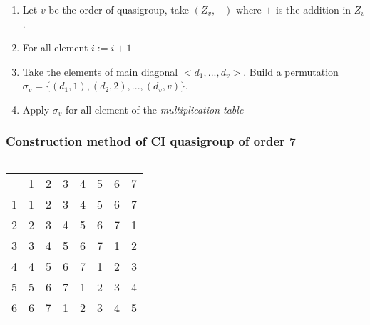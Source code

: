 \begin{frame}
\begin{enumerate}
	\item Let $v$ be the order of quasigroup, take $(Z_v,+)$ where $+$ is the addition in $Z_v$.
	\item For all element $i := i +1$
	\item Take the elements of main diagonal $<d_1,...,d_v>$. Build a permutation $\sigma_v = \{(d_1,1), (d_2,2),..., (d_v,v)\}$.
	\item Apply $\sigma_v$ for all element of the \textit{multiplication table}
\end{enumerate}
\end{frame}


\begin{frame}
\frametitle{Construction method of CI quasigroup of order 7}
\begin{columns}
	\begin{table}[]
		\begin{tabular}{llllllll}
			& 1                      & 2                      & 3                      & 4                      & 5                      & 6                      & 7                      \\ \cline{2-8} 
			\multicolumn{1}{l|}{1} & \multicolumn{1}{l|}{1} & \multicolumn{1}{l|}{2} & \multicolumn{1}{l|}{3} & \multicolumn{1}{l|}{4} & \multicolumn{1}{l|}{5} & \multicolumn{1}{l|}{6} & \multicolumn{1}{l|}{7} \\ \cline{2-8} 
			\multicolumn{1}{l|}{2} & \multicolumn{1}{l|}{2} & \multicolumn{1}{l|}{3} & \multicolumn{1}{l|}{4} & \multicolumn{1}{l|}{5} & \multicolumn{1}{l|}{6} & \multicolumn{1}{l|}{7} & \multicolumn{1}{l|}{1} \\ \cline{2-8} 
			\multicolumn{1}{l|}{3} & \multicolumn{1}{l|}{3} & \multicolumn{1}{l|}{4} & \multicolumn{1}{l|}{5} & \multicolumn{1}{l|}{6} & \multicolumn{1}{l|}{7} & \multicolumn{1}{l|}{1} & \multicolumn{1}{l|}{2} \\ \cline{2-8} 
			\multicolumn{1}{l|}{4} & \multicolumn{1}{l|}{4} & \multicolumn{1}{l|}{5} & \multicolumn{1}{l|}{6} & \multicolumn{1}{l|}{7} & \multicolumn{1}{l|}{1} & \multicolumn{1}{l|}{2} & \multicolumn{1}{l|}{3} \\ \cline{2-8} 
			\multicolumn{1}{l|}{5} & \multicolumn{1}{l|}{5} & \multicolumn{1}{l|}{6} & \multicolumn{1}{l|}{7} & \multicolumn{1}{l|}{1} & \multicolumn{1}{l|}{2} & \multicolumn{1}{l|}{3} & \multicolumn{1}{l|}{4} \\ \cline{2-8} 
			\multicolumn{1}{l|}{6} & \multicolumn{1}{l|}{6} & \multicolumn{1}{l|}{7} & \multicolumn{1}{l|}{1} & \multicolumn{1}{l|}{2} & \multicolumn{1}{l|}{3} & \multicolumn{1}{l|}{4} & \multicolumn{1}{l|}{5} \\ \cline{2-8} 

\end{tabular}
\end{table}
\end{columns}
\end{frame}
